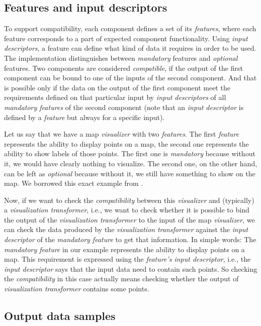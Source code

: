 \subsection{Features and input descriptors}

To support compatibility, each component defines a set of its \emph{features}, where each feature corresponds to a part of expected component functionality. Using \emph{input descriptors}, a feature can define what kind of data it requires in order to be used. The implementation distinguishes between \emph{mandatory} features and \emph{optional} features. Two components are considered \emph{compatible}, if the output of the first component can be bound to one of the inputs of the second component. And that is possible only if the data on the output of the first component meet the requirements defined on that particular input by \emph{input descriptors} of all \emph{mandatory features} of the second component (note that an \emph{input descriptor} is defined by a \emph{feature} but always for a specific input).

Let us say that we have a map \emph{visualizer} with two \emph{features}. The first \emph{feature} represents the ability to display points on a map, the second one represents the ability to show labels of those points. The first one is \emph{mandatory} because without it,  we would have clearly nothing to visualize. The second one, on the other hand, can be left as \emph{optional} because without it, we still have something to show on the map. We borrowed this exact example from \cite{ldvm_use_cases}. 

Now, if we want to check the \emph{compatibility} between this \emph{visualizer} and (typically) a \emph{visualization transformer}, i.e., we want to check whether it is possible to bind the output of the \emph{visualization transformer} to the input of the map \emph{visualizer}, we can check the data produced by the \emph{visualization transformer} against the \emph{input descriptor} of the \emph{mandatory feature} to get that information. In simple words: The \emph{mandatory feature} in our example represents the ability to display points on a map. This requirement is expressed using the \emph{feature's input descriptor}, i.e., the \emph{input descriptor} says that the input data need to contain such points. So checking the \emph{compatibility} in this case actually means checking whether the output of \emph{visualization transformer} contains some points.

\subsection{Output data samples}

